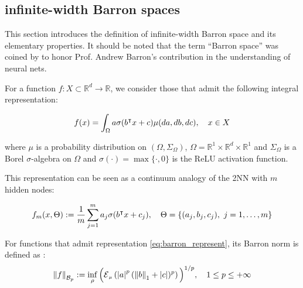\subsection{infinite-width Barron spaces}
\label{sec:barron_norm}

This section introduces the definition of infinite-width Barron space and its
elementary properties. It should be noted that the term ``Barron space'' was
coined by \cite{ePrioriEstimatesPopulation2019} to honor Prof. Andrew Barron's
contribution in the understanding of neural nets.


For a function $f: X \subset \mathbb{R}^d \to \mathbb{R}$, we consider those
that admit the following integral representation:

\begin{equation}
    \label{eq:barron_represent}
    f(x) = \int_{\Omega} a \sigma(b{}^{\intercal} x + c) \mu(da, db, dc), \quad x \in X
\end{equation}

where $\mu$ is a probability distribution on $(\Omega, \Sigma_\Omega)$, $\Omega
= \mathbb{R}^1 \times \mathbb{R}^d \times \mathbb{R}^1$ and $\Sigma_\Omega$ is
a Borel $\sigma$-algebra on $\Omega$ and $\sigma(\cdot) = \max\{\cdot, 0\}$ is
the ReLU activation function.

This representation can be seen as a continuum analogy of the 2NN with $m$
hidden nodes:

\begin{equation}
    f_m(x, \Theta) := \frac{1}{m} 
    \sum_{j=1}^m a_j 
        \sigma(b{}^{\intercal} x + c_j), 
    \quad \Theta = \{(a_j, b_j, c_j), \ j = 1, \dots, m\}
\end{equation}

\begin{definition} For functions that admit representation
    \eqref{eq:barron_represent}, its Barron norm is defined as
    \cite{eBarronSpaceFlowinduced2021}:
    \begin{equation}\label{eq:barron_norm}
        \barronnorm{f}{p} := \inf_{\rho} \Big(\ERWi{\mu}{\abs{a}^p 
        (\norm{b}_1 + \abs{c})^p}\Big)^{1/p},
        \quad 1 \leq p \leq +\infty
    \end{equation}
\end{definition}

